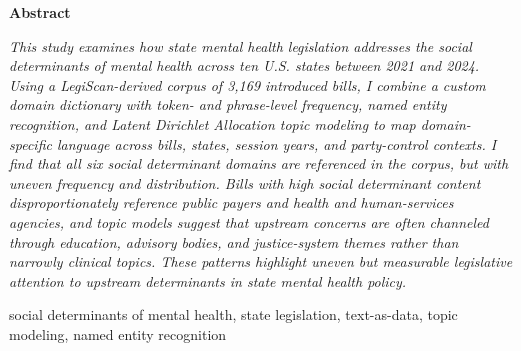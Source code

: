 \documentclass[10pt,twocolumn]{article}
\begin{document}

\begin{center}
{\fontsize{12}{14}\bfseries Abstract}
\end{center}
\vspace{6pt}
{\fontsize{10}{12}\itshape\selectfont
\parindent=0.635cm
\hspace{0.635cm}This study examines how state mental health legislation
addresses the social determinants of mental health across ten U.S.
states between 2021 and 2024. Using a LegiScan-derived corpus of 3,169
introduced bills, I combine a custom domain dictionary with token- and
phrase-level frequency, named entity recognition, and Latent Dirichlet
Allocation topic modeling to map domain-specific language across bills,
states, session years, and party-control contexts. I find that all six
social determinant domains are referenced in the corpus, but with uneven
frequency and distribution. Bills with high social determinant content
disproportionately reference public payers and health and human-services
agencies, and topic models suggest that upstream concerns are often
channeled through education, advisory bodies, and justice-system themes
rather than narrowly clinical topics. These patterns highlight uneven
but measurable legislative attention to upstream determinants in state
mental health policy.}
\par\vspace{12pt}

 social determinants of
mental health, state legislation, text-as-data, topic modeling, named
entity recognition
\par\vspace{6pt}
\end{document}
